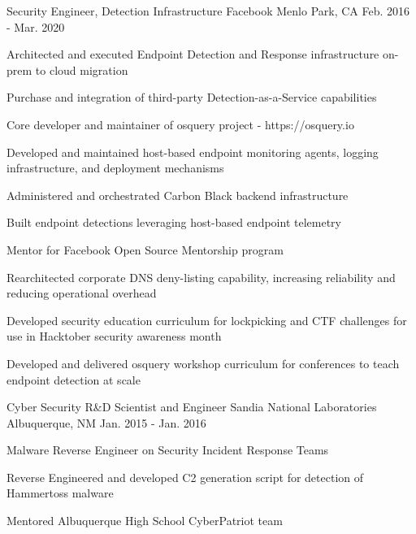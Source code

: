 \begin{cventries}
\cventry
{Security Engineer, Detection Infrastructure} %
{Facebook} %
{Menlo Park, CA} %
{Feb. 2016 - Mar. 2020} %
{ %
\begin{cvitems}
\item {Architected and executed Endpoint Detection and Response infrastructure on-prem to cloud migration}
\item {Purchase and integration of third-party Detection-as-a-Service capabilities}
\item {Core developer and maintainer of osquery project - https://osquery.io}
\item {Developed and maintained host-based endpoint monitoring agents, logging infrastructure, and deployment mechanisms}
\item {Administered and orchestrated Carbon Black backend infrastructure}
\item {Built endpoint detections leveraging host-based endpoint telemetry}
\item {Mentor for Facebook Open Source Mentorship program}
\item {Rearchitected corporate DNS deny-listing capability, increasing reliability and reducing operational overhead}
\item {Developed security education curriculum for lockpicking and CTF challenges for use in Hacktober security awareness month}
\item {Developed and delivered osquery workshop curriculum for conferences to teach endpoint detection at scale}
\end{cvitems}
}


\cventry
{Cyber Security R\&D Scientist and Engineer} %
{Sandia National Laboratories} %
{Albuquerque, NM} %
{Jan. 2015 - Jan. 2016} %
{ %
\begin{cvitems}
\item {Malware Reverse Engineer on Security Incident Response Teams}
\item {Reverse Engineered and developed C2 generation script for detection of Hammertoss malware}
\item {Mentored Albuquerque High School CyberPatriot team}
\end{cvitems}
}



\end{cventries}
